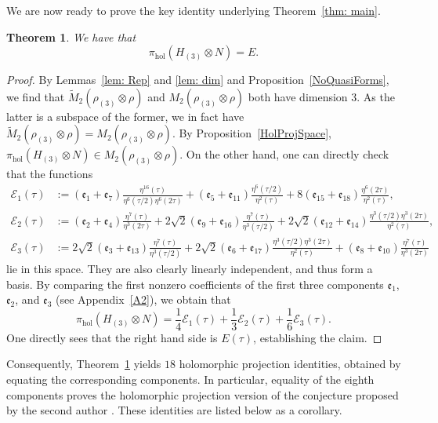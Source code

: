 \documentclass[11pt,reqno]{amsart}
\newcommand\vaa{\frac{\eta^{16}(\tau)}{\eta^6(\tau/2) \eta^6(2\tau)}}
\newcommand\vab{\frac{\eta^{6}(\tau/2)}{\eta^2(\tau)}}
\newcommand\vac{\frac{\eta^{6}(2\tau)}{\eta^2(\tau)}}
\newcommand\vba{\frac{\eta^{7}(\tau)}{\eta^3(\tau/2)}}
\newcommand\vbb{\frac{\eta^{3}(\tau/2)\eta^3(2\tau)}{\eta^2(\tau)}}
\newcommand\vbc{\frac{\eta^{7}(\tau)}{\eta^3(2\tau)}}
\newcommand\vca{\frac{\eta^{7}(\tau)}{\eta^3(2\tau)}}
\newcommand\vcb{\frac{\eta^{7}(\tau)}{\eta^3(\tau/2)}}
\newcommand\vcc{\frac{\eta^{3}(\tau/2)\eta^3(2\tau)}{\eta^2(\tau)}}
\newcommand\ev[1]{\mathfrak{e}_{#1}}
\newtheorem{theorem}{Theorem}[section]
\renewcommand{\=}{\;=\;}
\theoremstyle{myremark}
\begin{document}
We are now ready to prove the key identity underlying Theorem~\ref{thm: main}.
\begin{theorem}
\label{thm: equality}
We have that
\begin{equation} \label{eqn:tensor_projection}
\pi_{\mathrm{hol}}(H_{(3)}\!\otimes N)=E.
\end{equation}   
\end{theorem}
\begin{proof}
By Lemmas~\ref{lem: Rep} and \ref{lem: dim} and Proposition~\ref{NoQuasiForms}, we find that $\widetilde{M}_2(\rho_{(3)}\!\otimes \rho)$ and $M_2(\rho_{(3)}\!\otimes \rho)$ both have dimension $3$. 
As the latter is a subspace of the former, we in fact have $\widetilde{M}_2(\rho_{(3)}\!\otimes \rho)=M_2(\rho_{(3)}\!\otimes \rho)$.
By Proposition~\ref{HolProjSpace}, $\pi_{\mathrm{hol}}(H_{(3)}\!\otimes N)\in M_2(\rho_{(3)}\!\otimes \rho)$.
On the other hand, one can directly check that the functions 
\begin{align*}
\mathcal{E}_1(\tau) &:= 
(\ev{1}+\ev{7}) \vaa  + (\ev{5} + \ev{11}) \vab + 8(\ev{15}+\ev{18})\vac,\\
\mathcal{E}_2(\tau) &:= 
(\ev{2}+\ev{4}) \vca  + 2\sqrt{2}(\ev{9} + \ev{16}) \vcb + 2\sqrt{2}(\ev{12}+\ev{14})\vcc,
\\
\mathcal{E}_3(\tau) &:= 
2\sqrt{2} (\ev{3}+\ev{13}) \vba  + 2\sqrt{2}(\ev{6} + \ev{17}) \vbb + (\ev{8}+\ev{10})\vbc
\end{align*}
lie in this space. 
They are also clearly linearly independent, and thus form a basis.
By comparing the first nonzero coefficients of the first three components $\ev{1}$, $\ev{2}$, and $\ev{3}$ (see Appendix~\ref{A2}), we obtain that
\[
\pi_{\mathrm{hol}}(H_{(3)}\!\otimes N)=
\frac{1}{4} \mathcal{E}_1(\tau) + \frac{1}{3} \mathcal{E}_2(\tau)
+ \frac{1}{6} \mathcal{E}_3(\tau).
\]
One directly sees that the right hand side is $E(\tau)$, establishing the claim.
\end{proof}
Consequently, Theorem~\ref{thm: equality} yields $18$ holomorphic projection identities, obtained by equating the corresponding components. 
In particular, equality of the eighth components proves the holomorphic projection version of the conjecture proposed by the 
second author \cite{FG}. 
These identities are listed below as a corollary.
\end{document}
